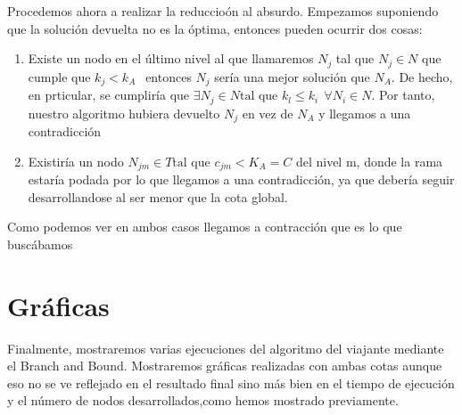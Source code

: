 \documentclass[11pt,openany]{book}
\begin{document}
Procedemos ahora a realizar la reduccioón al absurdo.
Empezamos suponiendo que la solución devuelta no es la óptima, entonces pueden ocurrir dos cosas:
\begin{enumerate}
    \item Existe un nodo en el último nivel al que llamaremos $N_j$ tal que $ N_j \in N$ que cumple que
     $k_j < k_A  \ \ $  entonces  $ N_j$  sería una mejor solución que $N_A$. De hecho, en prticular, se cumpliría que
     $ \exists N_j \in N \text{tal que } k_l \leq k_i  \ \ \forall N_i \in N $. Por tanto, nuestro algoritmo hubiera 
     devuelto $N_j$ en vez de $N_A$ y llegamos a una contradicción
    \item Existiría un nodo $N_{jm} \in T \text{tal que } c_{jm} < K_A = C$ del nivel m, donde la rama estaría podada
    por lo que llegamos a una contradicción, ya que debería seguir desarrollandose al ser menor que la cota global. 
\end{enumerate}

Como podemos ver en ambos casos llegamos a contracción que es lo que buscábamos

\newpage

\section{Gráficas}
Finalmente, mostraremos varias ejecuciones del algoritmo del viajante mediante el Branch and Bound. Mostraremos gráficas realizadas con ambas
cotas aunque eso no se ve reflejado en el resultado final sino más bien en el tiempo de ejecución y el número de nodos desarrollados,como hemos mostrado previamente.
\end{document}
